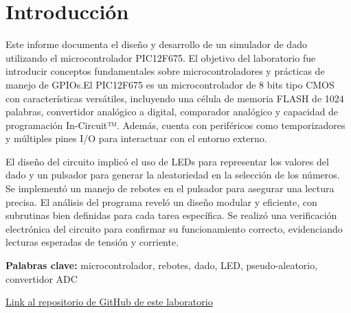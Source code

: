 \section{Introducción}

\hspace{1.26cm} Este informe documenta el diseño y desarrollo de un simulador de dado utilizando el microcontrolador PIC12F675. El objetivo del laboratorio fue introducir conceptos fundamentales sobre microcontroladores y prácticas de manejo de GPIOs.El PIC12F675 es un microcontrolador de 8 bits tipo CMOS con características versátiles, incluyendo una célula de memoria FLASH de 1024 palabras, convertidor analógico a digital, comparador analógico y capacidad de programación In-Circuit™. Además, cuenta con periféricos como temporizadores y múltiples pines I/O para interactuar con el entorno externo.

\hspace{1.26cm} El diseño del circuito implicó el uso de LEDs para representar los valores del dado y un pulsador para generar la aleatoriedad en la selección de los números. Se implementó un manejo de rebotes en el pulsador para asegurar una lectura precisa. El análisis del programa reveló un diseño modular y eficiente, con subrutinas bien definidas para cada tarea específica. Se realizó una verificación electrónica del circuito para confirmar su funcionamiento correcto, evidenciando lecturas esperadas de tensión y corriente.

\textbf{Palabras clave:} microcontrolador, rebotes, dado, LED, pseudo-aleatorio, convertidor ADC

\faGithub\href{https://github.com/Roger-505/labos-ie0624}{Link al repositorio de GitHub de este laboratorio}
